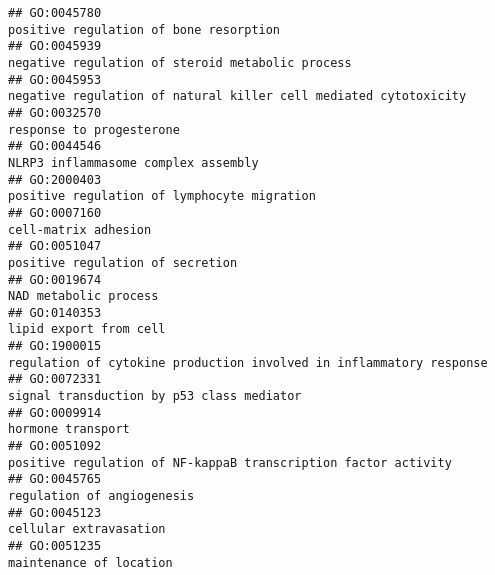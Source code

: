 \documentclass[
]{article}
\begin{document}
\begin{verbatim}
## GO:0045780                                                                                                           positive regulation of bone resorption
## GO:0045939                                                                                                 negative regulation of steroid metabolic process
## GO:0045953                                                                                 negative regulation of natural killer cell mediated cytotoxicity
## GO:0032570                                                                                                                         response to progesterone
## GO:0044546                                                                                                              NLRP3 inflammasome complex assembly
## GO:2000403                                                                                                      positive regulation of lymphocyte migration
## GO:0007160                                                                                                                             cell-matrix adhesion
## GO:0051047                                                                                                                 positive regulation of secretion
## GO:0019674                                                                                                                            NAD metabolic process
## GO:0140353                                                                                                                           lipid export from cell
## GO:1900015                                                                              regulation of cytokine production involved in inflammatory response
## GO:0072331                                                                                                        signal transduction by p53 class mediator
## GO:0009914                                                                                                                                hormone transport
## GO:0051092                                                                                   positive regulation of NF-kappaB transcription factor activity
## GO:0045765                                                                                                                       regulation of angiogenesis
## GO:0045123                                                                                                                           cellular extravasation
## GO:0051235                                                                                                                          maintenance of location

\end{verbatim}
\end{document}

